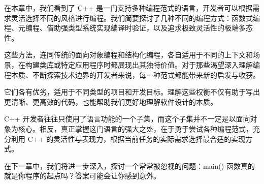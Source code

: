 在本章中，我们看到了 C++ 是一门支持多种编程范式的语言，开发者可以根据需求灵活选择不同的风格进行编程。我们简要探讨了几种不同的编程方式：函数式编程、元编程、借助强类型系统实现编译时验证，以及追求极致灵活性的极端多态性。

这些方法，连同传统的面向对象编程和结构化编程，各自适用于不同的上下文和场景，在构建类库或特定应用程序时都展现出其独特价值。对于那些渴望深入理解编程本质、不断探索技术边界的开发者来说，每一种范式都能带来新的启发与收获。

它们各有优劣，适用于不同类型的项目和开发目标。理解这些权衡不仅有助于写出更清晰、更高效的代码，也能帮助我们更好地理解软件设计的本质。

C++ 开发者往往只使用了语言功能的一个子集，而这个子集并不一定是以面向对象为核心。相反，真正掌握这门语言的强大之处，在于勇于尝试各种编程范式，充分利用 C++ 的灵活性与表现力，根据当前任务的实际需求选择最合适的实现方式。

在下一章中，我们将进一步深入，探讨一个常常被忽视的问题：main() 函数真的就是你程序的起点吗？答案可能会让你感到意外。